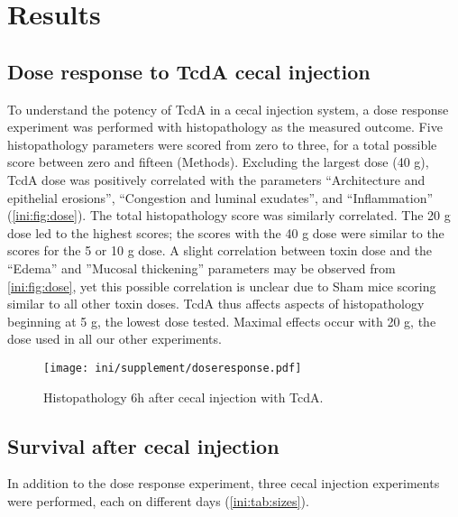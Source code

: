 \section{Results}

\subsection{Dose response to TcdA cecal injection}

To understand the potency of TcdA in a cecal injection system, a dose response
experiment was performed with histopathology as the measured outcome.
Five histopathology parameters were scored from zero to three, for a total possible score
between zero and fifteen (Methods). Excluding the largest dose (40 \textmugreek{}g),
TcdA dose was positively correlated with the parameters ``Architecture and epithelial erosions'', 
``Congestion and luminal exudates'', and
``Inflammation'' (\autoref{ini:fig:dose}). The total histopathology score was similarly correlated.
The 20 \textmugreek{}g dose led to the highest scores; the scores with
the 40 \textmugreek{}g dose were similar to the scores for the 5 or 10 \textmugreek{}g dose.
A slight correlation between toxin dose and the ``Edema'' and ''Mucosal thickening''
parameters may be observed from \autoref{ini:fig:dose}, yet this possible
correlation is unclear due to Sham mice scoring similar to all other toxin doses.
TcdA thus affects aspects of histopathology beginning at 5 \textmugreek{}g, the lowest
dose tested. Maximal effects occur with 20 \textmugreek{}g, the dose used in all our
other experiments.

\begin{figure}[h!]
\centering
\texttt{[image: ini/supplement/doseresponse.pdf]}
\caption{Histopathology 6h after cecal injection with TcdA.}
\label{ini:fig:dose}
\end{figure}

\subsection{Survival after cecal injection}

In addition to the dose response experiment, three cecal injection experiments were performed, each on
different days (\autoref{ini:tab:sizes}). 

